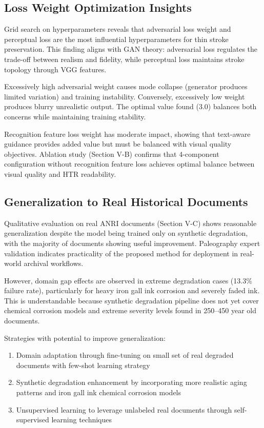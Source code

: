 \documentclass[journal]{IEEEtran}
\begin{document}
\subsection{Loss Weight Optimization Insights}

Grid search on hyperparameters reveals that adversarial loss weight and perceptual loss are the most influential hyperparameters for thin stroke preservation. This finding aligns with GAN theory: adversarial loss regulates the trade-off between realism and fidelity, while perceptual loss maintains stroke topology through VGG features.

Excessively high adversarial weight causes mode collapse (generator produces limited variation) and training instability. Conversely, excessively low weight produces blurry unrealistic output. The optimal value found (3.0) balances both concerns while maintaining training stability.

Recognition feature loss weight has moderate impact, showing that text-aware guidance provides added value but must be balanced with visual quality objectives. Ablation study (Section V-B) confirms that 4-component configuration without recognition feature loss achieves optimal balance between visual quality and HTR readability.

\subsection{Generalization to Real Historical Documents}

Qualitative evaluation on real ANRI documents (Section V-C) shows reasonable generalization despite the model being trained only on synthetic degradation, with the majority of documents showing useful improvement. Paleography expert validation indicates practicality of the proposed method for deployment in real-world archival workflows.

However, domain gap effects are observed in extreme degradation cases (13.3\% failure rate), particularly for heavy iron gall ink corrosion and severely faded ink. This is understandable because synthetic degradation pipeline does not yet cover chemical corrosion models and extreme severity levels found in 250--450 year old documents.

Strategies with potential to improve generalization:
\begin{enumerate}
    \item Domain adaptation through fine-tuning on small set of real degraded documents with few-shot learning strategy
    \item Synthetic degradation enhancement by incorporating more realistic aging patterns and iron gall ink chemical corrosion models
    \item Unsupervised learning to leverage unlabeled real documents through self-supervised learning techniques
\end{enumerate}
\end{document}
